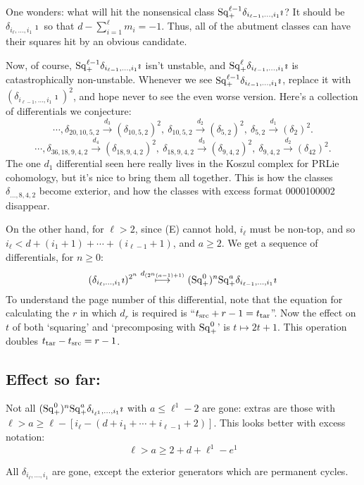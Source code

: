 \documentclass[10pt]{article}
\newcommand{\SqShift}{\Sq_{\smash{+}}}
\newcommand{\Sq}{\mathrm{Sq}}
\begin{document}
\begin{conjectured differentials}
\begin{itemise}
One wonders: what will hit the nonsensical class $\SqShift^{\ell-1}\delta_{i_{\ell-1},\ldots,i_1}\imath$? It should be $\delta_{i_{\ell},\ldots,i_1}\imath$ so that $d-\sum_{i=1}^\ell m_i=-1$. Thus, all of the abutment classes can have their squares hit by an obvious candidate.
\end{itemise}
Now, of course, $\SqShift^{\ell-1}\delta_{i_{\ell-1},\ldots,i_1}\imath$ isn't unstable, and $\SqShift^{\ell}\delta_{i_{\ell-1},\ldots,i_1}\imath$ is catastrophically non-unstable. Whenever we see $\SqShift^{\ell-1}\delta_{i_{\ell-1},\ldots,i_1}\imath$, replace it with $(\delta_{i_{\ell-1},\ldots,i_1}\imath)^2$, and hope never to see the even worse version. Here's a collection of differentials we conjecture:
\[\cdots, \delta_{20,10,5,2}\overset{d_{3}}{\to}(\delta_{10,5,2})^2,\ 
\delta_{10,5,2}\overset{d_{2}}{\to}(\delta_{5,2})^2,\ 
\delta_{5,2}\overset{d_{1}}{\to}(\delta_{2})^2. \]
\[\cdots, \delta_{36,18,9,4,2}\overset{d_{4}}{\to}(\delta_{18,9,4,2})^2,\ 
\delta_{18,9,4,2}\overset{d_{3}}{\to}(\delta_{9,4,2})^2,\ 
\delta_{9,4,2}\overset{d_{2}}{\to}(\delta_{42})^2. \]
The one $d_1$ differential seen here really lives in the Koszul complex for PRLie cohomology, but it's nice to bring them all together. This is how the classes $\delta_{\ldots ,8,4,2}$ become exterior, and how the classes with excess format 0000100002 disappear.

On the other hand, for $\ell>2$, since (E) cannot hold, $i_\ell$ must be non-top, and so $i_\ell< d+(i_1+1)+\cdots +(i_{\ell-1}+1)$, and $a\geq2$. We get a sequence of differentials, for $n\geq0$:
\[(\delta_{i_\ell,\ldots,i_1}\imath)^{2^n}\overset{d_{(2^n(a-1)+1)}}{\mapsto} (\SqShift^0)^{n}\SqShift^a\delta_{i_{\ell-1},\ldots,i_1}\imath\]
To understand the page number of this differential, note that the equation for calculating the $r$ in which $d_r$ is required is ``$t_\textup{src}+r-1=t_\textup{tar}$''. Now the effect on $t$ of both `squaring' and `precomposing with $\SqShift^0$' is $t\mapsto 2t+1$. This operation doubles $t_\textup{tar}-t_\textup{src}=r-1$.

\subsection*{Effect so far:}
\begin{itemise}
\setlength{\parindent}{.25in}
\item Not all $(\SqShift^0)^{n}\SqShift^a\delta_{i_{\ell^1},\ldots,i_1}\imath$ with  $a\leq\ell^1-2$ are gone: extras are those with $\ell>a\geq\ell-[i_\ell-(d+i_1+\cdots +i_{\ell-1}+2)]$. This looks better with excess notation:
\[\ell>a\geq 2+d+\ell^1-e^1\]
\item All $\delta_{i_\ell,\ldots,i_1}$ are gone, except the exterior generators which are permanent cycles.
\end{itemise}


\end{conjectured differentials}
\end{document}
